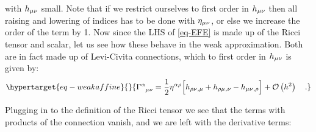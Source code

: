 \documentclass[
  letterpaper,
  DIV=11,
  numbers=noendperiod,
  oneside]{scrreprt}
\begin{document}
with
\(\texttip{\texttip{h}{weak metric tensor}_{{\mu\nu}}}{weak covariant metric tensor component}\)
small. Note that if we restrict ourselves to first order in
\(\texttip{\texttip{h}{weak metric tensor}_{{\mu\nu}}}{weak covariant metric tensor component}\)
then all raising and lowering of indices has to be done with
\(\texttip{\texttip{\eta}{Minkoski metric tensor +---}_{{\mu\nu}}}{covariant Minkoski metric components +---}\),
or else we increase the order of the term by 1. Now since the {LHS} of
\ref{eq-EFE} is made up of the Ricci tensor and scalar, let us see how
these behave in the weak approximation. Both are in fact made up of
Levi-Civita connections, which to first order in
\(\texttip{\texttip{h}{weak metric tensor}_{{\mu\nu}}}{weak covariant metric tensor component}\)
is given by:
\begin{equation}\protect\hypertarget{eq-weakaffine}{}{\mathtip{\Gamma^{\alpha}_{\phantom{\alpha}\mu\nu}}{\text{Levi-Civita Connection: }\Gamma^{\alpha}_{\phantom{\alpha}\mu\nu}=
\frac{1}{2} \texttip{\texttip{g}{metric tensor}^{\alpha \rho}}{contravariant metric tensor component}
\Big[
    \texttip{\texttip{g}{metric tensor}_{\rho \alpha}}{covariant metric tensor component}\texttip{{}_{,\mu}}{Partial derivative}
    +\texttip{\texttip{g}{metric tensor}_{\rho \mu}}{covariant metric tensor component}\texttip{{}_{,\alpha}}{Partial derivative}
    -\texttip{\texttip{g}{metric tensor}_{\mu \alpha}}{covariant metric tensor component}\texttip{{}_{,\rho}}{Partial derivative} \Big]
} = \frac{1}{2} \texttip{\texttip{\eta}{Minkoski metric tensor +---}^{\alpha \rho}}{contravariant Minkoski metric components +---}
\Big[
     \texttip{\texttip{h}{weak metric tensor}_{\rho \nu}}{weak covariant metric tensor component}\texttip{{}_{,\mu}}{Partial derivative}
    + \texttip{\texttip{h}{weak metric tensor}_{\rho \mu}}{weak covariant metric tensor component}\texttip{{}_{,\nu}}{Partial derivative}
    - \texttip{\texttip{h}{weak metric tensor}_{{\mu\nu}}}{weak covariant metric tensor component}\texttip{{}_{,\rho}}{Partial derivative} \Big] + \mathcal{O}\left(h^{2}\right)\quad .}\label{eq-weakaffine}\end{equation}

Plugging in to the definition of the Ricci tensor we see that the terms
with products of the connection vanish, and we are left with the
derivative terms:
\end{document}
